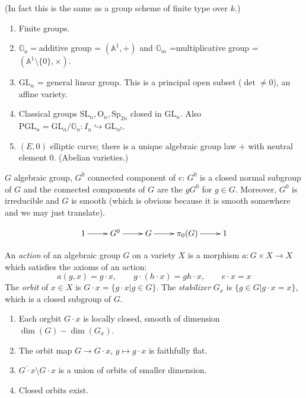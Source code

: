 (In fact this is the same as a group scheme of finite type over $k$.)

\begin{example}
\label{example-algebraic-groups}
\begin{enumerate}
\item Finite groups.
\item $\mathbb{G}_a=$additive group = $(\mathbb{A}^1,+)$ and $\mathbb{G}_m$
=multiplicative group = $(\mathbb{A}^1\setminus\{0\},\times)$.
\item $\text{GL}_n$ = general linear group. This is a principal open subset
($\det \neq 0$), an affine variety.
\item Classical groups $\text{SL}_n,\text{O}_n,\text{Sp}_{2n}$ closed in 
$\text{GL}_n$. Also 
$\text{PGL}_n=\text{GL}_n/\mathbb{G}_n:I_n\hookrightarrow\text{GL}_{n^2}$.
\item $(E,0)$ elliptic curve; there is a unique algebraic group law + with
neutral element $0$. (Abelian varieties.)
\end{enumerate}
\end{example}

\begin{proposition}
\label{proposition-connected-components-of-algebraic-group}
$G$ algebraic group, $G^0$ connected component of $e$: $G^0$ is a closed normal
subgroup of $G$ and the connected components of $G$ are the $gG^0$ for $g \in
G$. Moreover, $G^0$ is irreducible and $G$ is smooth (which is obvious because
it is smooth somewhere and we may just translate).
\end{proposition}
$$
\xymatrix{
1\ar[r]&G^0\ar[r]&G\ar[r]&\pi_0(G)\ar[r]&1
}
$$
\begin{definition}
\label{definition-action-of-algebraic-group}
An {\it action} of an algebraic group $G$ on a variety $X$ is a morphism $a:G
\times X \to X$ which satisfies the axioms of an action:
$$
a(g,x)=g\cdot x,\qquad  g\cdot(h\cdot x)=gh\cdot x,\qquad  e\cdot x=x
$$
The {\it orbit} of $x \in X$ is $G\cdot x=\{g\cdot x|g \in G\}$. The {\it
stabilizer} $G_x$ is $\{g \in G|g\cdot x=x\}$, which is a closed subgroup of
$G$.
\end{definition}

\begin{proposition}
\label{proposition-properties-of-orbit}
\begin{enumerate}
\item Each orgbit $G\cdot x$ is locally closed, smooth of dimension
$\dim(G)-\dim(G_x)$.
\item The orbit map $G \to G\cdot x$, $g \mapsto  g\cdot x$ is faithfully flat.
\item $\overline{G\cdot x}\setminus G\cdot x$ is a union of orbits of smaller
dimension.
\item Closed orbits exist.
\end{enumerate}
\end{proposition}

